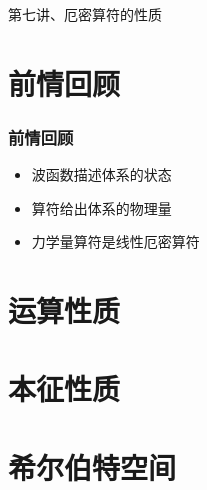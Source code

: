 \begin{frame}
    \frametitle{}
    \begin{center}
    { {\huge 第七讲、厄密算符的性质}}
    \end{center}    
\end{frame}


\section{前情回顾}

\begin{frame}
    \frametitle{前情回顾}
    \begin{itemize}
        \item 波函数描述体系的状态
        \item 算符给出体系的物理量
        \item 力学量算符是线性厄密算符
    \end{itemize}
\end{frame} 

\section{运算性质}

\section{本征性质}

\section{希尔伯特空间}